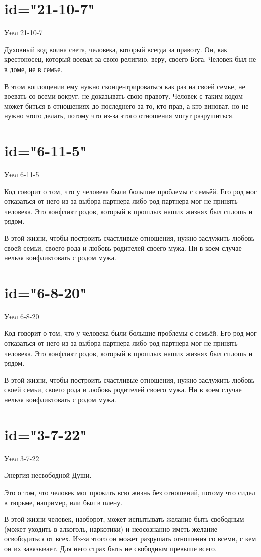 \section{id="21-10-7"}{Узел 21-10-7}
\item Духовный код воина света, человека, который всегда за 
правоту. Он, как крестоносец, который воевал за свою религию, 
веру, своего Бога. Человек был не в доме, не в семье.
\item В этом воплощении ему нужно сконцентрироваться как раз 
на своей семье, не воевать со всеми вокруг, не доказывать свою 
правоту. Человек с таким кодом может биться в отношениях до 
последнего за то, кто прав, а кто виноват, но не нужно этого 
делать, потому что из-за этого отношения могут разрушиться.
\endsection

\section{id="6-11-5"}{Узел 6-11-5}
\item Код говорит о том, что у человека были большие проблемы 
с семьёй. Его род мог отказаться от него из-за выбора партнера 
либо род партнера мог не принять человека. Это конфликт родов, 
который в прошлых наших жизнях был сплошь и рядом.
\item В этой жизни, чтобы построить счастливые отношения, нужно 
заслужить любовь своей семьи, своего рода и любовь родителей 
своего мужа. Ни в коем случае нельзя конфликтовать с родом мужа.
\endsection

\section{id="6-8-20"}{Узел 6-8-20}
\item Код говорит о том, что у человека были большие проблемы 
с семьёй. Его род мог отказаться от него из-за выбора партнера 
либо род партнера мог не принять человека. Это конфликт родов, 
который в прошлых наших жизнях был сплошь и рядом.
\item В этой жизни, чтобы построить счастливые отношения, нужно 
заслужить любовь своей семьи, своего рода и любовь родителей 
своего мужа. Ни в коем случае нельзя конфликтовать с родом мужа.
\endsection

\section{id="3-7-22"}{Узел 3-7-22}
\item Энергия несвободной Души.
\item Это о том, что человек мог прожить всю жизнь без 
отношений, потому что сидел в тюрьме, например, или был в плену.
\item В этой жизни человек, наоборот, может испытывать желание 
быть свободным (может уходить в алкоголь, наркотики) и 
неосознанно иметь желание освободиться от всех. Из-за этого он 
может разрушать отношения со всеми, с кем он их завязывает. 
Для него страх быть не свободным превыше всего.
\endsection

